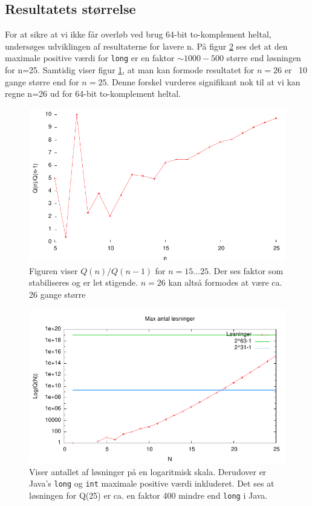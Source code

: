 \documentclass[final,a4paper,11pt]{article}
\begin{document}
\subsection{Resultatets størrelse}
For at sikre at vi ikke får overløb ved brug 64-bit to-komplement heltal, undersøges udviklingen af resultaterne for lavere n.
På figur \ref{figur:maxantal} ses det at den maximale positive værdi for \texttt{long} er en faktor  $\sim1000-500$  større end løsningen for n=25. Samtidig viser figur \ref{figur:loesningfaktor}, at man kan formode resultatet for $n=26$ er ~10 gange større end for $n=25$. Denne forskel vurderes signifikant nok til at vi kan regne n=26 ud for 64-bit to-komplement heltal.


\begin{figure}[h!]
\begin{center}
\includegraphics{../benchmarks/resultatstorrelse.pdf}
\caption{Figuren viser $Q(n)/Q(n-1)$ for $n=15\ldots25$. Der ses faktor som stabiliseres og er let stigende. $n=26$ kan altså formodes at være ca. 26 gange større}
\label{figur:loesningfaktor}
\end{center}
\end{figure}

\begin{figure}[h!]
\begin{center}
\includegraphics{../benchmarks/maxantal.pdf}
\caption{Viser antallet af løsninger på en logaritmisk skala. Derudover er Java's \texttt{long} og \texttt{int} maximale positive værdi inkluderet. Det ses at løsningen for Q(25) er ca. en faktor 400 mindre end \texttt{long} i Java.}
\label{figur:maxantal}
\end{center}
\end{figure}
\end{document}
